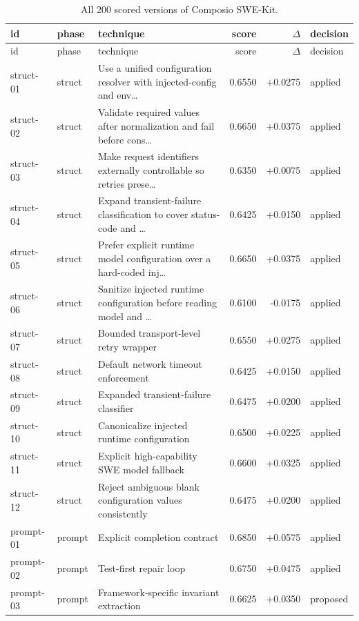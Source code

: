 \begin{center}\scriptsize\begin{longtable}{llp{5.2cm}rrl}
\caption{All 200 scored versions of Composio SWE-Kit.}\\
\toprule id & phase & technique & score & $\Delta$ & decision \\ \midrule \endfirsthead
\toprule id & phase & technique & score & $\Delta$ & decision \\ \midrule \endhead
struct-01 & struct & Use a unified configuration resolver with injected-config and env\ldots{} & 0.6550 & +0.0275 & applied \\
struct-02 & struct & Validate required values after normalization and fail before cons\ldots{} & 0.6650 & +0.0375 & applied \\
struct-03 & struct & Make request identifiers externally controllable so retries prese\ldots{} & 0.6350 & +0.0075 & applied \\
struct-04 & struct & Expand transient-failure classification to cover status-code and \ldots{} & 0.6425 & +0.0150 & applied \\
struct-05 & struct & Prefer explicit runtime model configuration over a hard-coded inj\ldots{} & 0.6650 & +0.0375 & applied \\
struct-06 & struct & Sanitize injected runtime configuration before reading model and \ldots{} & 0.6100 & -0.0175 & applied \\
struct-07 & struct & Bounded transport-level retry wrapper & 0.6550 & +0.0275 & applied \\
struct-08 & struct & Default network timeout enforcement & 0.6425 & +0.0150 & applied \\
struct-09 & struct & Expanded transient-failure classifier & 0.6475 & +0.0200 & applied \\
struct-10 & struct & Canonicalize injected runtime configuration & 0.6500 & +0.0225 & applied \\
struct-11 & struct & Explicit high-capability SWE model fallback & 0.6600 & +0.0325 & applied \\
struct-12 & struct & Reject ambiguous blank configuration values consistently & 0.6475 & +0.0200 & applied \\
prompt-01 & prompt & Explicit completion contract & 0.6850 & +0.0575 & applied \\
prompt-02 & prompt & Test-first repair loop & 0.6750 & +0.0475 & applied \\
prompt-03 & prompt & Framework-specific invariant extraction & 0.6625 & +0.0350 & proposed \\

\end{longtable}
\end{center}
